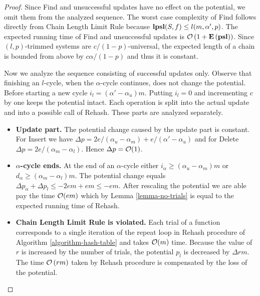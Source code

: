\begin{proof}
Since Find and unsuccessful updates have no effect on the potential, we omit them from the analyzed sequence. 
The worst case complexity of Find follows directly from Chain Length Limit Rule because $\mathbf{lpsl}(S, f) \leq l(m, \alpha', p)$.
The expected running time of Find and unsuccessful updates is $\mathcal{O}\left(1 + \mathbf{E}\left(\mathbf{psl}\right)\right)$.
Since $(l, p)$-trimmed systems are $c/(1 - p)$-universal, the expected length of a chain is bounded from above by $c\alpha/(1 - p)$ and thus it is constant.

Now we analyze the sequence consisting of successful updates only. 
Observe that finishing an $l$-cycle, when the $\alpha$-cycle continues, does not change the potential.
Before starting a new cycle $i_l = (\alpha' - \alpha_u)m$.
Putting $i_l = 0$ and incrementing $c$ by one keeps the potential intact.
Each operation is split into the actual update and into a possible call of Rehash. 
These parts are analyzed separately.
\begin{itemize}
	\item \textbf{Update part.} 
The potential change caused by the update part is constant. 
For Insert we have $\Delta p = 2e/(\alpha_u - \alpha_m) + e/(\alpha' - \alpha_u)$ and for Delete $\Delta p = 2e/(\alpha_m - \alpha_l)$. 
Hence $\Delta p = \mathcal{O}(1)$.

	\item \textbf{$\alpha$-cycle ends.} 
At the end of an $\alpha$-cycle either $i_\alpha \geq (\alpha_u - \alpha_m)m$ or $d_\alpha \geq (\alpha_m - \alpha_l)m$. 
The potential change equals $\Delta p_\alpha + \Delta p_l \leq -2em + em \leq -em$.
After rescaling the potential we are able pay the time $\mathcal{O}(em)$ which by Lemma \ref{lemma-no-trials} is equal to the expected running time of Rehash.

	\item \textbf{Chain Length Limit Rule is violated.} 
Each trial of a function corresponds to a single iteration of the repeat loop in Rehash procedure of Algorithm \ref{algorithm-hash-table} and takes $\mathcal{O}(m)$ time. 
Because the value of $r$ is increased by the number of trials, the potential $p_l$ is decreased by $\Delta rm$. 
The time $\mathcal{O}\left(rm\right)$ taken by Rehash procedure is compensated by the loss of the potential.
\end{itemize}


\end{proof}
